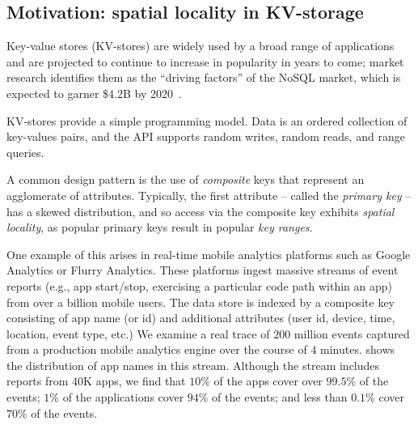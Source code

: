 \subsection{Motivation: spatial locality in KV-storage} 

Key-value stores (KV-stores) are widely used  by a broad range of applications and are projected
to continue to increase in popularity in years to come; market research  identifies them as the 
``driving factors'' of the NoSQL market, which is expected to garner \$4.2B by 2020~\cite{alliedmarketresearch}.

KV-stores provide a simple programming model. 
Data is an ordered collection of key-values pairs, and  the API supports random writes, 
random reads, and range queries. 

A common design pattern is the use of \emph{composite} keys that represent an agglomerate of attributes.
Typically, the first attribute -- called the \emph{primary key} -- has a skewed distribution, and so   access via the composite key exhibits \emph{spatial locality}, as 
popular primary keys result in popular \emph{key ranges}. 

One example of this arises in real-time mobile analytics platforms such as Google Analytics or Flurry Analytics.   
These platforms ingest massive streams of event reports (e.g., app start/stop,  exercising a particular code path within an app) from over a billion mobile users.  
The data store is indexed by a composite key consisting of  app name (or id) and additional attributes (user id, device, time, location, event type, etc.) 
We examine a real trace of  $200$ million events captured from a production mobile analytics engine over the course of $4$ minutes.  
 shows the distribution of app names in this stream.  
Although the stream includes reports from $40$K apps, 
we find that $10$\% of the apps cover over $99.5$\% of the events; $1$\% of the applications cover $94$\% of the events; and less than $0.1$\% cover $70$\% of the events. 


